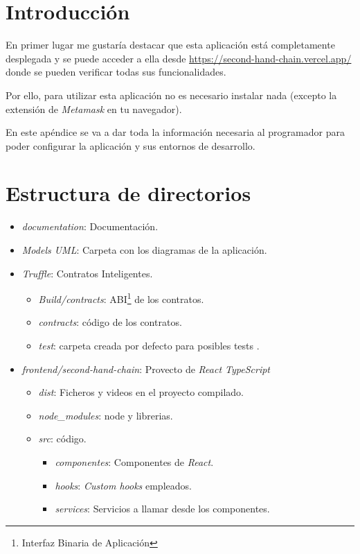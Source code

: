 
\section{Introducción}
En primer lugar me gustaría destacar que esta aplicación está completamente desplegada y se puede acceder a ella desde \url{https://second-hand-chain.vercel.app/} donde se pueden verificar todas sus funcionalidades. 

Por ello, para utilizar esta aplicación no es necesario instalar nada (excepto la extensión de \textit{Metamask} en tu navegador).

En este apéndice se va a dar toda la información necesaria al programador para poder configurar la aplicación y sus entornos de desarrollo.

\section{Estructura de directorios}

\begin{itemize}
    \item \textit{documentation}: Documentación.
    \item \textit{Models UML}: Carpeta con los diagramas de la aplicación.
    \item \textit{Truffle}: Contratos Inteligentes.
        \begin{itemize}
            \item \textit{Build/contracts}: ABI\footnote{Interfaz Binaria de Aplicación} de  los contratos.
            \item \textit{contracts}: código de los contratos.
            \item \textit{test}: carpeta creada por defecto para posibles tests .
        \end{itemize}
    \item \textit{frontend/second-hand-chain}: Provecto de \textit{React TypeScript}
            \begin{itemize}
            \item \textit{dist}: Ficheros y videos en el proyecto compilado.
            \item \textit{node\_modules}: node y librerias.
            \item \textit{src}: código.
                \begin{itemize}
                    \item \textit{componentes}: Componentes de \textit{React}.
                    \item \textit{hooks}: \textit{Custom hooks} empleados.
                    \item \textit{services}: Servicios a llamar desde los componentes.
                \end{itemize}
        \end{itemize}
\end{itemize}

